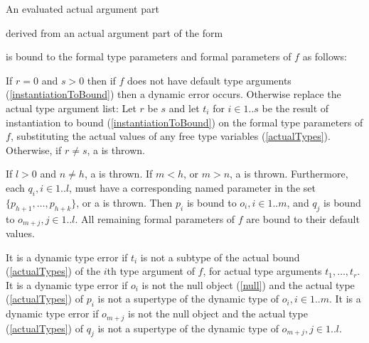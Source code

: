 \documentclass[makeidx]{article}
\begin{document}
{\LMHash{}%
An evaluated actual argument part

\noindent
{}

\noindent
derived from an actual argument part of the form

\noindent
{}

\noindent
is bound to the formal type parameters and formal parameters of $f$ as follows:

\LMHash{}%
If $r = 0$ and $s > 0$ then
if $f$ does not have default type arguments
(\ref{instantiationToBound})
then a dynamic error occurs.
Otherwise replace the actual type argument list:
Let $r$ be $s$ and let $t_i$ for $i \in 1 .. s$ be the result of
instantiation to bound
(\ref{instantiationToBound})
on the formal type parameters of $f$,
substituting the actual values of any free type variables
(\ref{actualTypes}).
Otherwise, if $r \not= s$, a  is thrown.

\LMHash{}%
If $l > 0$ and $n \not= h$, a  is thrown.
If $m < h$, or $m > n$, a  is thrown.
Furthermore, each
$q_i, i \in 1 .. l$,
must have a corresponding named parameter in the set
$\{p_{h+1}, \ldots, p_{h+k}\}$,
or a  is thrown.
Then $p_i$ is bound to
$o_i, i \in 1 .. m$,
and $q_j$ is bound to $o_{m+j}, j \in 1 .. l$.
All remaining formal parameters of $f$ are bound to their default values.


\LMHash{}%
It is a dynamic type error if $t_i$ is not a subtype of the actual bound
(\ref{actualTypes})
of the $i$th type argument of $f$, for actual type arguments $t_1, \ldots, t_r$.
It is a dynamic type error if $o_i$ is not the null object (\ref{null})
and the actual type
(\ref{actualTypes})
of $p_i$ is not a supertype of the dynamic type of $o_i, i \in 1 .. m$.
It is a dynamic type error if $o_{m+j}$ is
not the null object and the actual type
(\ref{actualTypes})
of $q_j$ is not a supertype of the dynamic type of $o_{m+j}, j \in 1 .. l$.


}
\end{document}
